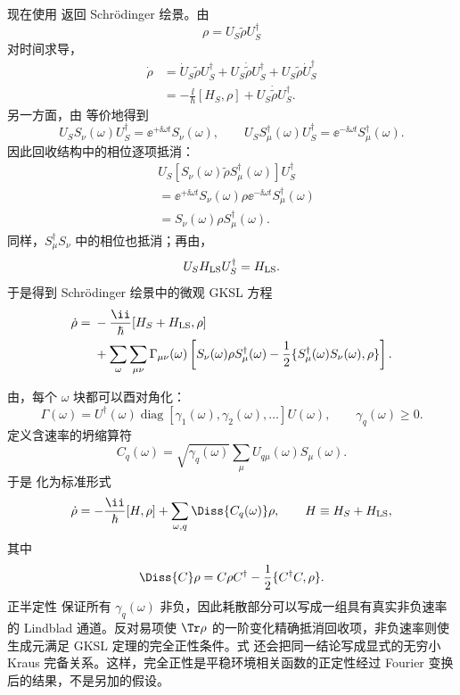 现在使用 返回 Schr\"odinger 绘景。由
\[
\rho=U_S\widetilde\rho U_S^\dagger
\]
对时间求导，
\[
\begin{aligned}
\dot\rho
&=\dot U_S\widetilde\rho U_S^\dagger
+U_S\dot{\widetilde\rho}U_S^\dagger
+U_S\widetilde\rho\dot U_S^\dagger\\
&=-\frac{\ii}{\hbar}[H_S,\rho]
+U_S\dot{\widetilde\rho}U_S^\dagger.
\end{aligned}
\]
另一方面，由 等价地得到
\[
U_SS_\nu(\omega)U_S^\dagger
=\ee^{+\ii\omega t}S_\nu(\omega),
\qquad
U_SS_\mu^\dagger(\omega)U_S^\dagger
=\ee^{-\ii\omega t}S_\mu^\dagger(\omega).
\]
因此回收结构中的相位逐项抵消：
\[
\begin{aligned}
&U_S
[S_\nu(\omega)\widetilde\rho S_\mu^\dagger(\omega)]
U_S^\dagger\\
&=\ee^{+\ii\omega t}S_\nu(\omega)
\rho
\ee^{-\ii\omega t}S_\mu^\dagger(\omega)\\
&=S_\nu(\omega)\rho S_\mu^\dagger(\omega).
\end{aligned}
\]
同样，$S_\mu^\dagger S_\nu$ 中的相位也抵消；再由，
\[
U_SH_{\rm LS} U_S^\dagger=H_{\rm LS}.
\]
于是得到 Schr\"odinger 绘景中的微观 GKSL 方程
\begin{equation}
\begin{aligned}
\dot\rho
={}&-\frac{\ii}{\hbar}[H_S+H_{\rm LS},\rho]\\
&+\sum_\omega\sum_{\mu\nu}
\Gamma_{\mu\nu}(\omega)
\left[
S_\nu(\omega)\rho S_\mu^\dagger(\omega)
-\frac12\{S_\mu^\dagger(\omega)S_\nu(\omega),\rho\}
\right].
\end{aligned}
\label{eq:phys-oqs-gksl-microscopic}
\end{equation}

由，每个 $\omega$ 块都可以酉对角化：
\[
\Gamma(\omega)
=U^\dagger(\omega)
\operatorname{diag}[\gamma_1(\omega),\gamma_2(\omega),\ldots]
U(\omega),
\qquad
\gamma_q(\omega)\ge0.
\]
定义含速率的坍缩算符
\begin{equation}
C_q(\omega)
=\sqrt{\gamma_q(\omega)}
\sum_\mu U_{q\mu}(\omega)S_\mu(\omega).
\label{eq:phys-oqs-collapse-from-gamma}
\end{equation}
于是 化为标准形式
\begin{equation}
\dot\rho
=-\frac{\ii}{\hbar}[H,\rho]
+\sum_{\omega,q}\Diss{C_q(\omega)}\rho,
\qquad
H\equiv H_S+H_{\rm LS},
\label{eq:phys-oqs-gksl-standard}
\end{equation}
其中
\begin{equation}
\Diss{C}\rho
=C\rho C^\dagger-\frac12\{C^\dagger C,\rho\}.
\label{eq:phys-oqs-dissipator}
\end{equation}
正半定性 保证所有 $\gamma_q(\omega)$ 非负，因此耗散部分可以写成一组具有真实非负速率的 Lindblad 通道。反对易项使 $\Tr\rho$ 的一阶变化精确抵消回收项，非负速率则使生成元满足 GKSL 定理的完全正性条件。式  还会把同一结论写成显式的无穷小 Kraus 完备关系。这样，完全正性是平稳环境相关函数的正定性经过 Fourier 变换后的结果，不是另加的假设。

